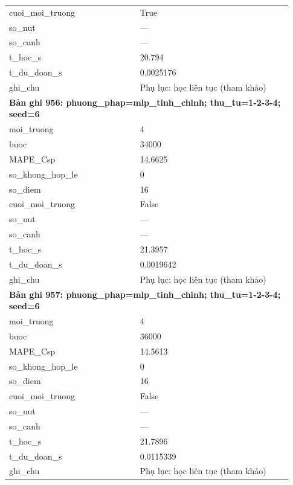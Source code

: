 \begin{longtable}{p{0.43\linewidth}p{0.50\linewidth}}
cuoi\_\allowbreak moi\_\allowbreak truong & True \\
so\_\allowbreak nut & — \\
so\_\allowbreak canh & — \\
t\_\allowbreak hoc\_\allowbreak s & 20.794 \\
t\_\allowbreak du\_\allowbreak doan\_\allowbreak s & 0.0025176 \\
ghi\_\allowbreak chu & Phụ lục: học liên tục (tham khảo) \\
\midrule
\multicolumn{2}{p{0.95\linewidth}}{\textbf{Bản ghi 956: phuong\_phap=mlp\_tinh\_chinh; thu\_tu=1-2-3-4; seed=6}} \\
moi\_\allowbreak truong & 4 \\
buoc & 34000 \\
MAPE\_\allowbreak Csp & 14.6625 \\
so\_\allowbreak khong\_\allowbreak hop\_\allowbreak le & 0 \\
so\_\allowbreak diem & 16 \\
cuoi\_\allowbreak moi\_\allowbreak truong & False \\
so\_\allowbreak nut & — \\
so\_\allowbreak canh & — \\
t\_\allowbreak hoc\_\allowbreak s & 21.3957 \\
t\_\allowbreak du\_\allowbreak doan\_\allowbreak s & 0.0019642 \\
ghi\_\allowbreak chu & Phụ lục: học liên tục (tham khảo) \\
\midrule
\multicolumn{2}{p{0.95\linewidth}}{\textbf{Bản ghi 957: phuong\_phap=mlp\_tinh\_chinh; thu\_tu=1-2-3-4; seed=6}} \\
moi\_\allowbreak truong & 4 \\
buoc & 36000 \\
MAPE\_\allowbreak Csp & 14.5613 \\
so\_\allowbreak khong\_\allowbreak hop\_\allowbreak le & 0 \\
so\_\allowbreak diem & 16 \\
cuoi\_\allowbreak moi\_\allowbreak truong & False \\
so\_\allowbreak nut & — \\
so\_\allowbreak canh & — \\
t\_\allowbreak hoc\_\allowbreak s & 21.7896 \\
t\_\allowbreak du\_\allowbreak doan\_\allowbreak s & 0.0115339 \\
ghi\_\allowbreak chu & Phụ lục: học liên tục (tham khảo) \\

\end{longtable}
